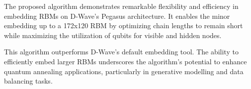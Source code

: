 The proposed algorithm demonstrates remarkable flexibility and efficiency in embedding RBMs on D-Wave's Pegasus architecture. It enables the minor embedding up to a 172x120 RBM by optimizing chain lengths to remain short while maximizing the utilization of qubits for visible and hidden nodes.

This algorithm outperforms D-Wave’s default embedding tool. The ability to efficiently embed larger RBMs underscores the algorithm’s potential to enhance quantum annealing applications, particularly in generative modelling and data balancing tasks.